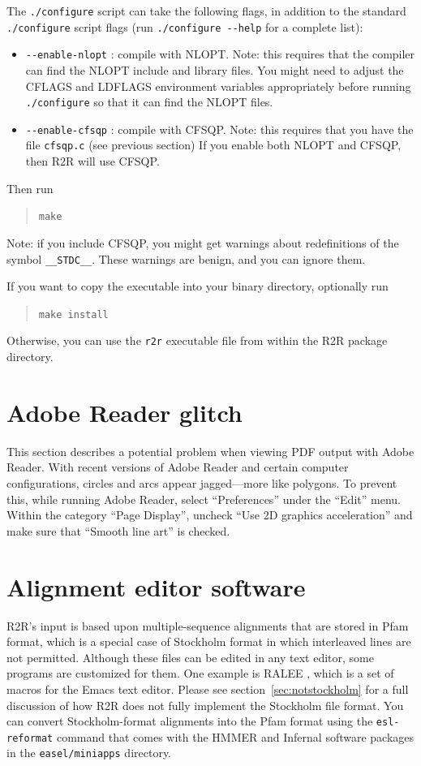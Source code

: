 \documentclass[letterpaper,12pt]{report}
\begin{document}
The {\tt ./configure} script can take the following flags, in addition to the standard {\tt ./configure} script flags (run {\tt ./configure -{}-help} for a complete list):
\begin{itemize}
\item {\tt -{}-enable-nlopt} : compile with NLOPT.  Note: this requires that the compiler can find the NLOPT include and library files.  You might need to adjust the CFLAGS and LDFLAGS environment variables appropriately before running {\tt ./configure} so that it can find the NLOPT files.
\item {\tt -{}-enable-cfsqp} : compile with CFSQP.  Note: this requires that you have the file {\tt cfsqp.c} (see previous section)  If you enable both NLOPT and CFSQP, then R2R will use CFSQP.
\end{itemize}

Then run
\begin{quote}
{\tt make}
\end{quote}
Note: if you include CFSQP, you might get warnings about redefinitions of the symbol {\tt \_\_STDC\_\_}.  These warnings are benign, and you can ignore them.

If you want to copy the executable into your binary directory, optionally run
\begin{quote}
{\tt make install}
\end{quote}
Otherwise, you can use the {\tt r2r} executable file from within the R2R package directory.

\section{Adobe Reader glitch}
\label{sec:SillyReader}

This section describes a potential problem when viewing PDF output with Adobe Reader.  With recent versions of Adobe Reader and certain computer configurations, circles and arcs appear jagged---more like polygons.  To prevent this, while running Adobe Reader, select ``Preferences'' under the ``Edit'' menu.  Within the category ``Page Display'', uncheck ``Use 2D graphics acceleration'' and make sure that ``Smooth line art'' is checked.

\section{Alignment editor software}

R2R's input is based upon multiple-sequence alignments that are
stored in Pfam format, which is a special case of Stockholm format in which interleaved lines are not permitted.
Although these files can be edited in any text editor, some programs
are customized for them.
One example is RALEE \cite{RALEE}, which is a set of macros for
the Emacs text editor.
Please see section~\ref{sec:notstockholm} for a full discussion of how R2R does not fully implement the Stockholm file format.
You can convert Stockholm-format alignments into the Pfam format using the {\tt esl-reformat} command that comes with the HMMER and Infernal software packages in the {\tt easel/miniapps} directory.
\end{document}
